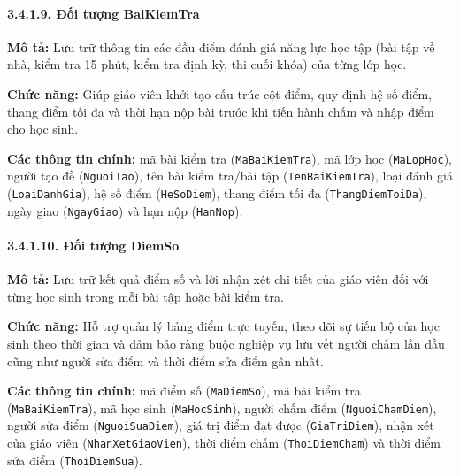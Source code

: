 \documentclass[12pt,a4paper]{article}
\begin{document}
\paragraph{3.4.1.9. Đối tượng BaiKiemTra}\mbox{}\par
\textbf{Mô tả:} Lưu trữ thông tin các đầu điểm đánh giá năng lực học tập (bài tập về nhà, kiểm tra 15 phút, kiểm tra định kỳ, thi cuối khóa) của từng lớp học.\par
\textbf{Chức năng:} Giúp giáo viên khởi tạo cấu trúc cột điểm, quy định hệ số điểm, thang điểm tối đa và thời hạn nộp bài trước khi tiến hành chấm và nhập điểm cho học sinh.\par
\textbf{Các thông tin chính:} mã bài kiểm tra (\texttt{MaBaiKiemTra}), mã lớp học (\texttt{MaLopHoc}), người tạo đề (\texttt{NguoiTao}), tên bài kiểm tra/bài tập (\texttt{TenBaiKiemTra}), loại đánh giá (\texttt{LoaiDanhGia}), hệ số điểm (\texttt{HeSoDiem}), thang điểm tối đa (\texttt{ThangDiemToiDa}), ngày giao (\texttt{NgayGiao}) và hạn nộp (\texttt{HanNop}).

\paragraph{3.4.1.10. Đối tượng DiemSo}\mbox{}\par
\textbf{Mô tả:} Lưu trữ kết quả điểm số và lời nhận xét chi tiết của giáo viên đối với từng học sinh trong mỗi bài tập hoặc bài kiểm tra.\par
\textbf{Chức năng:} Hỗ trợ quản lý bảng điểm trực tuyến, theo dõi sự tiến bộ của học sinh theo thời gian và đảm bảo ràng buộc nghiệp vụ lưu vết người chấm lần đầu cũng như người sửa điểm và thời điểm sửa điểm gần nhất.\par
\textbf{Các thông tin chính:} mã điểm số (\texttt{MaDiemSo}), mã bài kiểm tra (\texttt{MaBaiKiemTra}), mã học sinh (\texttt{MaHocSinh}), người chấm điểm (\texttt{NguoiChamDiem}), người sửa điểm (\texttt{NguoiSuaDiem}), giá trị điểm đạt được (\texttt{GiaTriDiem}), nhận xét của giáo viên (\texttt{NhanXetGiaoVien}), thời điểm chấm (\texttt{ThoiDiemCham}) và thời điểm sửa điểm (\texttt{ThoiDiemSua}).
\end{document}
